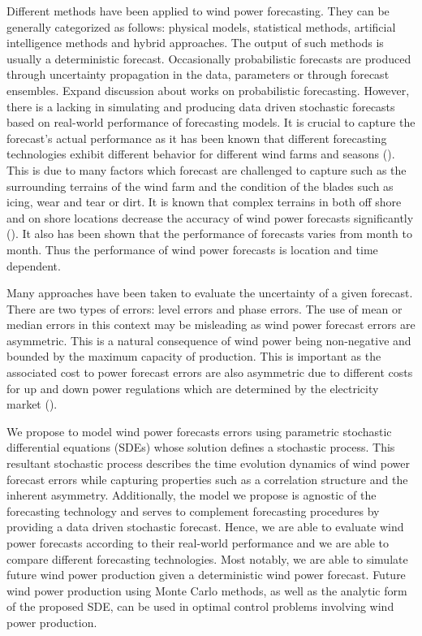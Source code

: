\documentclass[11pt]{article}
\theoremstyle{definition}
\begin{document}
Different methods have been applied to wind power forecasting. They can be generally categorized as follows: physical models, statistical methods, artificial intelligence methods and hybrid approaches. The output of such methods is usually a deterministic forecast. Occasionally probabilistic forecasts are produced through uncertainty propagation in the data, parameters or through forecast ensembles. {\color{red} Expand discussion about works on probabilistic forecasting.} However, there is a lacking in simulating and producing data driven stochastic forecasts based on real-world performance of forecasting models. It is crucial to capture the forecast's actual performance as it has been known that different forecasting technologies exhibit different behavior for different wind farms and seasons (\cite{chang}). This is due to many factors which forecast are challenged to capture such as the surrounding terrains of the wind farm and the condition of the blades such as icing, wear and tear or dirt. It is known that complex terrains in both off shore and on shore locations decrease the accuracy of wind power forecasts significantly (\cite{schicker2017short}). It also has been shown that the performance of forecasts varies from month to month. Thus the performance of wind power forecasts is location and time dependent.

Many approaches have been taken to evaluate the uncertainty of a given forecast. There are two types of errors: level errors and phase errors. The use of mean or median errors in this context may be misleading as wind power forecast errors are asymmetric. This is a natural consequence of wind power being non-negative and bounded by the maximum capacity of production. This is important as the associated cost to power forecast errors are also asymmetric due to different costs for up and down power regulations which are determined by the electricity market (\cite{tsitsiklis2015pricing}).

We propose to model wind power forecasts errors using parametric stochastic differential equations (SDEs) whose solution defines a stochastic process. This resultant stochastic process describes the time evolution dynamics of wind power forecast errors while capturing properties such as a correlation structure and the inherent asymmetry. Additionally, the model we propose is agnostic of the forecasting technology and serves to complement forecasting procedures by providing a data driven stochastic forecast. Hence, we are able to evaluate wind power forecasts according to their real-world performance and we are able to compare different forecasting technologies. Most notably, we are able to simulate future wind power production given a deterministic wind power forecast. Future wind power production using Monte Carlo methods, as well as the analytic form of the proposed SDE, can be used in optimal control problems involving wind power production.
\end{document}
